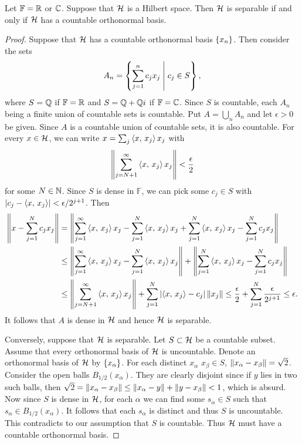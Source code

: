 \begin{theorem}\label{thm:separable_countable_basis}
    Let $\mathbb{F} = \mathbb{R}$ or $\mathbb{C}$. Suppose that $\mathcal{H}$ is a Hilbert space. Then $\mathcal{H}$ 
    is separable if and only if $\mathcal{H}$ has a countable orthonormal basis.
\end{theorem}
\begin{proof}
    Suppose that $\mathcal{H}$ has a countable orthonormal basis $\left\{ {x_n} \right\}$. Then consider 
    the sets
    \begin{equation*}
        A_n = \left\{ \sum_{j=1}^n c_jx_j \;\middle\vert\; c_j\in S \right\},
    \end{equation*}
    where $S = \mathbb{Q}$ if $\mathbb{F} = \mathbb{R}$ and $S = \mathbb{Q} + \mathbb{Q} i$ if $\mathbb{F} = \mathbb{C}$. 
    Since $S$ is countable, each $A_n$ being a finite union of countable sets is 
    countable. Put $A = \bigcup_n A_n$ and let $\epsilon>0$ be given. Since $A$ is 
    a countable union of countable sets, it is also countable. For every $x\in\mathcal{H}$, 
    we can write $x = \sum_j \left\langle {x},\, {x_j} \right\rangle x_j$ with 
    \begin{equation*}
        \left\lVert {\sum_{j=N+1}^{\infty}\left\langle {x},\, {x_j} \right\rangle x_j} \right\rVert < \frac{\epsilon}{2}
    \end{equation*}
    for some $N\in\mathbb{N}$. Since $S$ is dense in $\mathbb{F}$, we can pick some 
    $c_j\in S$ with $\left\lvert {c_j - \left\langle {x},\, {x_j} \right\rangle} \right\rvert < \epsilon/2^{j+1}$. Then 
    \begin{equation*}
        \begin{split}
            \left\lVert {x - \sum_{j=1}^N c_jx_j} \right\rVert 
            &= \left\lVert {\sum_{j=1}^{\infty}\left\langle {x},\, {x_j} \right\rangle x_j - \sum_{j=1}^{N} \left\langle {x},\, {x_j} \right\rangle x_j + \sum_{j=1}^{N} \left\langle {x},\, {x_j} \right\rangle x_j - \sum_{j=1}^N c_jx_j} \right\rVert \\
            &\leq \left\lVert {\sum_{j=1}^{\infty}\left\langle {x},\, {x_j} \right\rangle x_j - \sum_{j=1}^{N} \left\langle {x},\, {x_j} \right\rangle x_j} \right\rVert + \left\lVert {\sum_{j=1}^{N} \left\langle {x},\, {x_j} \right\rangle x_j - \sum_{j=1}^N c_jx_j} \right\rVert \\ 
            &\leq \left\lVert {\sum_{j=N+1}^{\infty}\left\langle {x},\, {x_j} \right\rangle x_j} \right\rVert + \sum_{j=1}^{N}\left\lvert {\left\langle {x},\, {x_j} \right\rangle - c_j} \right\rvert\left\lVert {x_j} \right\rVert 
            \leq \frac{\epsilon}{2} + \sum_{j=1}^{N}\frac{\epsilon}{2^{j+1}} \leq \epsilon.
        \end{split}
    \end{equation*}
    It follows that $A$ is dense in $\mathcal{H}$ and hence $\mathcal{H}$ is separable. 
    
    Conversely, suppose that $\mathcal{H}$ is separable. Let $S\subset\mathcal{H}$ be a countable 
    subset. Assume that every orthonormal basis of $\mathcal{H}$ is uncountable. Denote an 
    orthonormal basis of $\mathcal{H}$ by $\left\{ {x_\alpha} \right\}$. For each distinct $x_\alpha$ 
    $x_\beta\in S$, $\left\lVert {x_\alpha - x_\beta} \right\rVert = \sqrt{2}$. Consider the open 
    balls $B_{1/2}(x_\alpha)$. They are clearly disjoint since if $y$ lies in 
    two such balls, then $\sqrt{2} = \left\lVert {x_\alpha - x_\beta} \right\rVert\leq 
    \left\lVert {x_\alpha - y} \right\rVert + \left\lVert {y - x_\beta} \right\rVert < 1$, which is absurd. Now since $S$ 
    is dense in $\mathcal{H}$, for each $\alpha$ we can find some $s_\alpha\in S$ such that 
    $s_\alpha\in B_{1/2}(x_\alpha)$. It follows that each $s_\alpha$ is distinct 
    and thus $S$ is uncountable. This contradicts to our assumption that $S$ is 
    countable. Thus $\mathcal{H}$ must have a countable orthonormal basis.
\end{proof}

